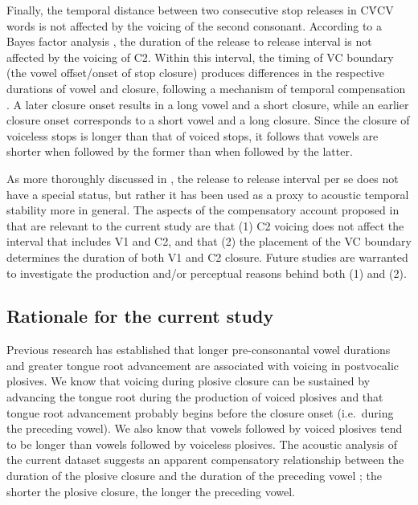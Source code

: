 \documentclass[preprint]{JASAnew}
\begin{document}
Finally, the temporal distance between two consecutive stop releases in
CV́CV words is not affected by the voicing of the second consonant.
According to a Bayes factor analysis \citep{coretta2019k}, the duration
of the release to release interval is not affected by the voicing of C2.
Within this interval, the timing of VC boundary (the vowel offset/onset
of stop closure) produces differences in the respective durations of
vowel and closure, following a mechanism of temporal compensation
\citep{lindblom1967, slis1969a, slis1969b, lehiste1970a, lehiste1970b}.
A later closure onset results in a long vowel and a short closure, while
an earlier closure onset corresponds to a short vowel and a long
closure. Since the closure of voiceless stops is longer than that of
voiced stops, it follows that vowels are shorter when followed by the
former than when followed by the latter.

As more thoroughly discussed in \citet{coretta2019k}, the release to
release interval per se does not have a special status, but rather it
has been used as a proxy to acoustic temporal stability more in general.
The aspects of the compensatory account proposed in \citet{coretta2018k}
that are relevant to the current study are that (1) C2 voicing does not
affect the interval that includes V1 and C2, and that (2) the placement
of the VC boundary determines the duration of both V1 and C2 closure.
Future studies are warranted to investigate the production and/or
perceptual reasons behind both (1) and (2).

\hypertarget{rationale-for-the-current-study}{%
\subsection{Rationale for the current
study}\label{rationale-for-the-current-study}}

Previous research has established that longer pre-consonantal vowel
durations \citep{house1953, peterson1960, chen1970} and greater tongue
root advancement \citep{kent1969, perkell1969, westbury1983} are
associated with voicing in postvocalic plosives. We know that voicing
during plosive closure can be sustained by advancing the tongue root
during the production of voiced plosives and that tongue root
advancement probably begins before the closure onset (i.e.~during the
preceding vowel). We also know that vowels followed by voiced plosives
tend to be longer than vowels followed by voiceless plosives. The
acoustic analysis of the current dataset suggests an apparent
compensatory relationship between the duration of the plosive closure
and the duration of the preceding vowel \citep{coretta2019k}; the
shorter the plosive closure, the longer the preceding vowel.
\end{document}
